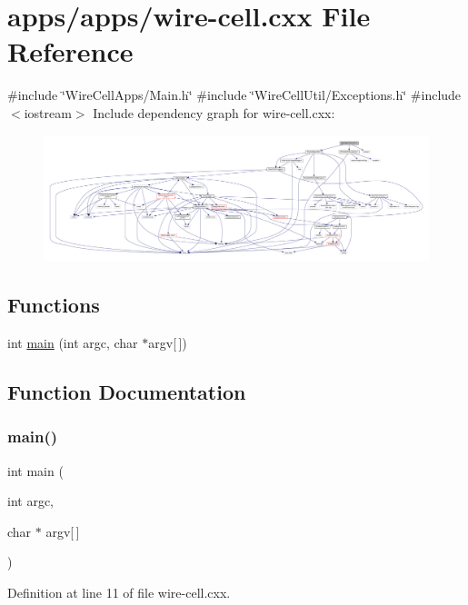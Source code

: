 \hypertarget{wire-cell_8cxx}{}\section{apps/apps/wire-\/cell.cxx File Reference}
\label{wire-cell_8cxx}
{\ttfamily \#include \char`\"{}Wire\+Cell\+Apps/\+Main.\+h\char`\"{}}\newline
{\ttfamily \#include \char`\"{}Wire\+Cell\+Util/\+Exceptions.\+h\char`\"{}}\newline
{\ttfamily \#include $<$iostream$>$}\newline
Include dependency graph for wire-\/cell.cxx\+:\nopagebreak
\begin{figure}[H]
\begin{center}
\leavevmode
\includegraphics[width=350pt]{wire-cell_8cxx__incl}
\end{center}
\end{figure}
\subsection*{Functions}
\begin{DoxyCompactItemize}
\item 
int \hyperlink{wire-cell_8cxx_a0ddf1224851353fc92bfbff6f499fa97}{main} (int argc, char $\ast$argv\mbox{[}$\,$\mbox{]})
\end{DoxyCompactItemize}


\subsection{Function Documentation}
\mbox{\label{wire-cell_8cxx_a0ddf1224851353fc92bfbff6f499fa97}} 
\subsubsection{\texorpdfstring{main()}{main()}}
{\footnotesize\ttfamily int main (\begin{DoxyParamCaption}\item[{int}]{argc,  }\item[{char $\ast$}]{argv\mbox{[}$\,$\mbox{]} }\end{DoxyParamCaption})}



Definition at line 11 of file wire-\/cell.\+cxx.

